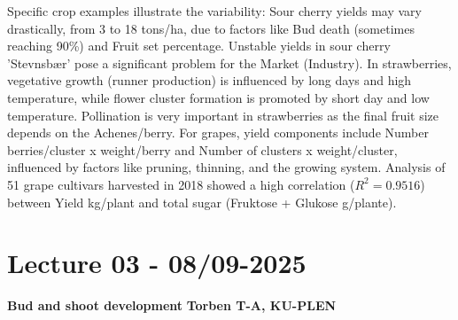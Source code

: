 Specific crop examples illustrate the variability: Sour cherry yields may vary drastically, from 3 to 18 tons/ha, due to factors like Bud death (sometimes reaching 90\%) and Fruit set percentage. Unstable yields in sour cherry 'Stevnsbær' pose a significant problem for the Market (Industry). In strawberries, vegetative growth (runner production) is influenced by long days and high temperature, while flower cluster formation is promoted by short day and low temperature. Pollination is very important in strawberries as the final fruit size depends on the Achenes/berry. For grapes, yield components include Number berries/cluster x weight/berry and Number of clusters x weight/cluster, influenced by factors like pruning, thinning, and the growing system. Analysis of 51 grape cultivars harvested in 2018 showed a high correlation ($R^2=0.9516$) between Yield kg/plant and total sugar (Fruktose + Glukose g/plante).


\section{Lecture 03 - 08/09-2025}
\textbf{Bud and shoot development}
\textbf{Torben T-A, KU-PLEN}

